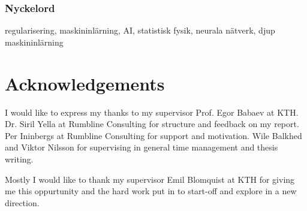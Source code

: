 \subsection*{Nyckelord}
regularisering, maskininlärning, AI, statistisk fysik, neurala nätverk, djup maskininlärning


\newpage
\thispagestyle{plain}
\chapter*{Acknowledgements}
I would like to express my thanks to my supervisor Prof. Egor Babaev at KTH. Dr. Siril Yella at Rumbline Consulting for structure and feedback on my report. Per Ininbergs at Rumbline Consulting for support and motivation. Wile Balkhed and Viktor Nilsson for supervising in general time management and thesis writing. 

Mostly I would like to thank my supervisor Emil Blomquist at KTH for giving me this oppurtunity and the hard work put in to start-off and explore in a new direction.

\newpage

\thispagestyle{plain}

\tableofcontents

\newpage
{}

